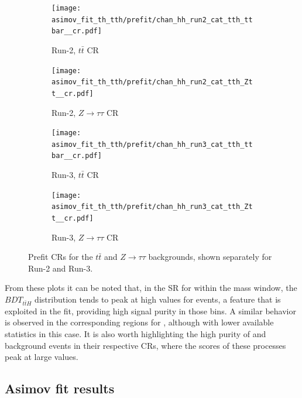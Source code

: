 \begin{figure}[htbp]
  \centering
  \begin{subfigure}[t]{0.45\textwidth}
    \centering
    \texttt{[image: asimov\_fit\_th\_tth/prefit/chan\_hh\_run2\_cat\_tth\_ttbar\_\_cr.pdf]}
    \caption{Run-2, $t\bar{t}$ CR}
  \end{subfigure}
  \hfill
  \begin{subfigure}[t]{0.45\textwidth}
    \centering
    \texttt{[image: asimov\_fit\_th\_tth/prefit/chan\_hh\_run2\_cat\_tth\_Ztt\_\_cr.pdf]}
    \caption{Run-2, $Z\to\tau\tau$ CR}
  \end{subfigure}

  \vspace{0.4cm}
  \begin{subfigure}[t]{0.45\textwidth}
    \centering
    \texttt{[image: asimov\_fit\_th\_tth/prefit/chan\_hh\_run3\_cat\_tth\_ttbar\_\_cr.pdf]}
    \caption{Run-3, $t\bar{t}$ CR}
  \end{subfigure}
  \hfill
  \begin{subfigure}[t]{0.45\textwidth}
    \centering
    \texttt{[image: asimov\_fit\_th\_tth/prefit/chan\_hh\_run3\_cat\_tth\_Ztt\_\_cr.pdf]}
    \caption{Run-3, $Z\to\tau\tau$ CR}
  \end{subfigure}

  \caption{Prefit CRs for the $t\bar{t}$ and $Z\to\tau\tau$ backgrounds, shown separately for Run-2 and Run-3.}
  \label{fig:crs}
\end{figure}
From these plots it can be noted that, in the SR for \ttH within the mass window, the $BDT_{t\bar{t}H}$ distribution tends to peak at high values for \ttH events, a feature that is exploited in the fit, providing high signal purity in those bins. A similar behavior is observed in the corresponding regions for \thqb, although with lower available statistics in this case. It is also worth highlighting the high purity of \ttbar and \ztautau background events in their respective CRs, where the scores of these processes peak at large values.

\subsection{Asimov fit results}

